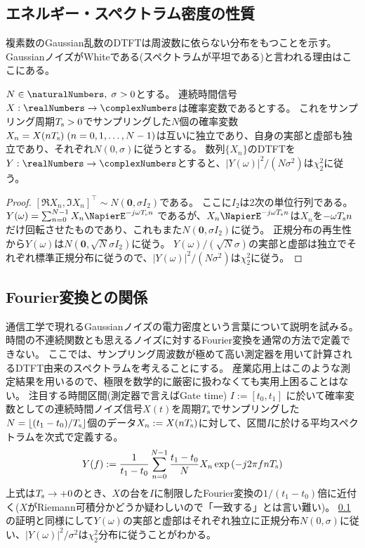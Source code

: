         \subsection{エネルギー・スペクトラム密度の性質}
            \label{GaussianノイズのDTFTのエネルギー・スペクトラム密度}
            複素数のGaussian乱数のDTFTは周波数に依らない分布をもつことを示す。
            GaussianノイズがWhiteである(スペクトラムが平坦である)と言われる理由はここにある。
            \begin{shadebox}
                $N\in\naturalNumbers,\;\sigma>0$とする。
                連続時間信号$X:\realNumbers\to\complexNumbers$は確率変数であるとする。
                これをサンプリング周期$T_\text{s}>0$でサンプリングした$N$個の確率変数$X_n = X(nT_\text{s})\;(n=0,1,\dots,N-1)$は互いに独立であり、自身の実部と虚部も独立であり、それぞれ$N(0,\sigma)$に従うとする。
                数列$\{X_n\}$のDTFTを$Y:\realNumbers\to\complexNumbers$とすると、$|Y(\omega)|^2/(N\sigma^2)$は$\chi_2^2$に従う。
            \end{shadebox}
            \begin{proof}
                \quad\par
                $[\Re{X_n}, \Im{X_n}]^\top \sim N(\bm{0}, \sigma I_2)$である。
                ここに$I_2$は2次の単位行列である。
                $Y(\omega) = \sum_{n=0}^{N-1} X_n \NapierE^{-j\omega\Ts n}$
                であるが、$X_n \NapierE^{-j\omega\Ts n}$は$X_n$を$-\omega T_\text{s} n$だけ回転させたものであり、これもまた$N(\bm{0}, \sigma I_2)$に従う。
                正規分布の再生性から$Y(\omega)$は$N(\bm{0}, \sqrt{N}\sigma I_2)$に従う。
                $Y(\omega)/(\sqrt{N}\sigma)$の実部と虚部は独立でそれぞれ標準正規分布に従うので、$|Y(\omega)|^2/(N\sigma^2)$は$\chi_2^2$に従う。
            \end{proof}
        \subsection{Fourier変換との関係}
            通信工学で現れるGaussianノイズの電力密度という言葉について説明を試みる。
            時間の不連続関数とも思えるノイズに対するFourier変換を通常の方法で定義できない。
            ここでは、サンプリング周波数が極めて高い測定器を用いて計算されるDTFT由来のスペクトラムを考えることにする。
            産業応用上はこのような測定結果を用いるので、極限を数学的に厳密に扱わなくても実用上困ることはない。
            注目する時間区間(測定器で言えばGate time) $I := [t_0,t_1]$ に於いて確率変数としての連続時間ノイズ信号$X(t)$を周期$T_\text{s}$でサンプリングした$N = \lfloor(t_1-t_0)/T_\text{s}\rfloor$個のデータ$X_n := X(nT_\text{s})$に対して、区間$I$に於ける平均スペクトラムを次式で定義する。
            \[ Y(f) := \frac{1}{t_1-t_0}\sum_{n=0}^{N-1} \frac{t_1-t_0}{N} X_n \exp\left(-j2\pi f nT_\text{s}\right) \]
            上式は$T_\text{s}\to +0$のとき、$X$の台を$I$に制限したFourier変換の$1/(t_1-t_0)$倍に近付く($X$がRiemann可積分かどうか疑わしいので「一致する」とは言い難い)。
            \ref{GaussianノイズのDTFTのエネルギー・スペクトラム密度}の証明と同様にして$Y(\omega)$の実部と虚部はそれぞれ独立に正規分布$N(0,\sigma)$に従い、$|Y(\omega)|^2/\sigma^2$は$\chi_2^2$分布に従うことがわかる。
